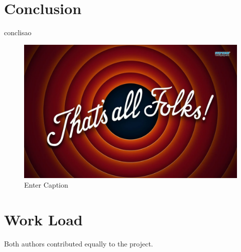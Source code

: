 \documentclass[conference]{IEEEtran}
\begin{document}
\section{Conclusion}

conclisao

\begin{figure}[H]
    \centering
    \includegraphics[width=0.5\linewidth]{image.png}
    \caption{Enter Caption}
    \label{fig:enter-label}
\end{figure}

\section*{Work Load}

Both authors contributed equally to the project.



\end{document}
